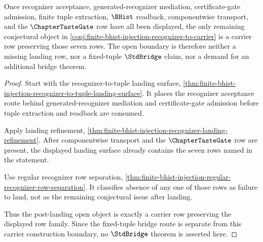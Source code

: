 \begin{theorem}
\label{thm:finite-bhist-injection-regular-recognizer-status-sharpens}
Once recognizer acceptance, generated-recognizer mediation, certificate-gate admission, finite tuple extraction, $\BHist$ readback, componentwise transport, and the $\ChapterTasteGate$ row have all been displayed, the only remaining conjectural object in \autoref{conj:finite-bhist-injection-recognizer-to-carrier} is a carrier row preserving those seven rows. The open boundary is therefore neither a missing landing row, nor a fixed-tuple $\StdBridge$ claim, nor a demand for an additional bridge theorem.
\end{theorem}
\begin{proof}
Start with the recognizer-to-tuple landing surface, \autoref{thm:finite-bhist-injection-recognizer-to-tuple-landing-surface}. It places the recognizer acceptance route behind generated-recognizer mediation and certificate-gate admission before tuple extraction and readback are consumed.

Apply landing refinement, \autoref{thm:finite-bhist-injection-recognizer-landing-refinement}. After componentwise transport and the $\ChapterTasteGate$ row are present, the displayed landing surface already contains the seven rows named in the statement.

Use regular recognizer row separation, \autoref{thm:finite-bhist-injection-regular-recognizer-row-separation}. It classifies absence of any one of those rows as failure to land, not as the remaining conjectural issue after landing.

Thus the post-landing open object is exactly a carrier row preserving the displayed row family. Since the fixed-tuple bridge route is separate from this carrier construction boundary, no $\StdBridge$ theorem is asserted here.
\end{proof}

